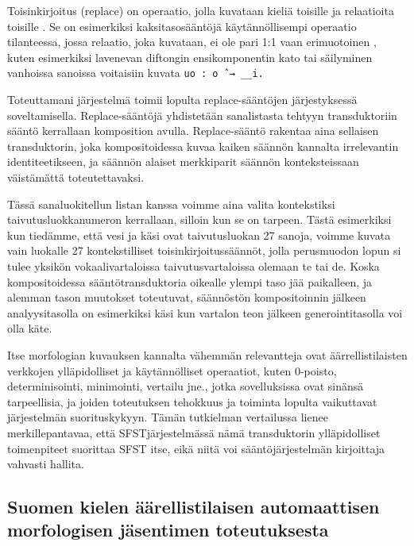 \documentclass[free]{flammie}
\begin{document}
Toisinkirjoitus (replace) on operaatio, jolla kuvataan kieliä toisille ja relaatioita
toisille \cite{karttunen1995replace}. Se on esimerkiksi kaksitasosääntöjä käytännöllisempi
operaatio tilanteessa, jossa relaatio, joka kuvataan, ei ole pari 1:1 vaan
erimuotoinen \cite{schmid2007b}, kuten esimerkiksi lavenevan diftongin ensikomponentin
kato tai säilyminen vanhoissa sanoissa voitaisiin kuvata \verb|uo : o ˆ→ __i.|

Toteuttamani järjestelmä toimii lopulta replace-sääntöjen järjestyksessä soveltamisella. Replace-sääntöjä yhdistetään sanalistasta tehtyyn transduktoriin sääntö
kerrallaan komposition avulla. Replace-sääntö rakentaa aina sellaisen transduktorin, joka kompositoidessa kuvaa kaiken säännön kannalta irrelevantin identiteetikseen, ja säännön alaiset merkkiparit säännön konteksteissaan väistämättä toteutettavaksi.

Tässä sanaluokitellun listan kanssa voimme aina valita kontekstiksi taivutusluokkanumeron kerrallaan, silloin kun se on tarpeen. Tästä esimerkiksi kun tiedämme, että vesi ja käsi ovat taivutusluokan 27 sanoja, voimme kuvata vain luokalle
27 kontekstilliset toisinkirjoitussäännöt, jolla perusmuodon lopun si tulee yksikön vokaalivartaloissa taivutusvartaloissa olemaan te tai de. Koska kompositoidessa sääntötransduktoria oikealle ylempi taso jää paikalleen, ja alemman tason
muutokset toteutuvat, säännöstön kompositoinnin jälkeen analyysitasolla on esimerkiksi käsi kun vartalon teon jälkeen generointitasolla voi olla käte.

Itse morfologian kuvauksen kannalta vähemmän relevantteja ovat
äärrellistilaisten verkkojen ylläpidolliset ja käytännölliset operaatiot, kuten
0-poisto, determinisointi, minimointi, vertailu jne., jotka sovelluksissa ovat sinänsä tarpeellisia,
ja joiden toteutuksen tehokkuus ja toiminta lopulta vaikuttavat järjestelmän suorituskykyyn. Tämän tutkielman vertailussa lienee merkillepantavaa, että SFSTjärjestelmässä nämä transduktorin ylläpidolliset toimenpiteet suorittaa SFST itse,
eikä niitä voi sääntöjärjestelmän kirjoittaja vahvasti hallita.


\subsection{Suomen kielen äärellistilaisen automaattisen morfologisen
jäsentimen toteutuksesta}
\end{document}
